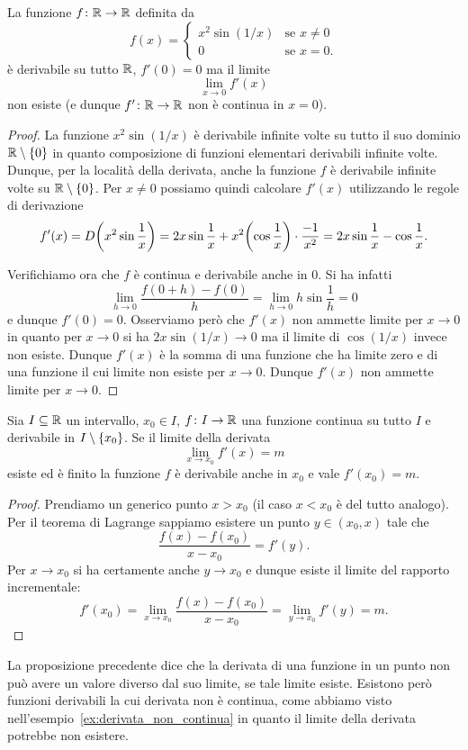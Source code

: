 \begin{example}
\label{ex:derivata_non_continua}%
\mymark{**}%
%
%
La funzione $f\colon {\mathbb R} \to {\mathbb R}$ definita da
\[
  f(x)
  = \begin{cases}
    x^2 \sin(1/x) & \text{se $x \neq 0$} \\
    0 & \text{se $x=0$.}
  \end{cases}
\]
è derivabile su tutto ${\mathbb R}$, $f'(0)=0$ ma il limite
\[
\lim_{x\to 0} f'(x)
\]
non esiste (e dunque $f'\colon {\mathbb R}\to{\mathbb R}$ non è continua in $x=0$).
\end{example}
%
\begin{proof}
La funzione $x^2 \sin(1/x)$ è derivabile infinite volte su tutto il suo dominio ${\mathbb R}\setminus{\left\{ 0 \right\}}$ in quanto composizione di funzioni elementari derivabili infinite volte.
Dunque, per la località della derivata, anche la funzione $f$ è derivabile infinite volte su ${\mathbb R}\setminus{\left\{ 0 \right\}}$.
Per $x\neq 0$ possiamo quindi calcolare $f'(x)$ utilizzando le regole di derivazione
\[
  f'(x)
  = D {\left( x^2\sin \frac 1 x \right)}
  = 2x \sin \frac 1 x + x^2 {\left( \cos \frac 1 x \right)} \cdot\frac{-1}{x^2}
  = 2x \sin \frac 1 x - \cos \frac 1 x.
\]

Verifichiamo ora che $f$ è continua e derivabile anche in $0$.
Si ha infatti
\[
 \lim_{h\to 0}\frac{f(0+h)-f(0)}{h}
 = \lim_{h\to 0} h \sin \frac 1 h = 0
\]
e dunque $f'(0) = 0$.
Osserviamo però che $f'(x)$ non ammette limite per $x\to 0$
in quanto per $x \to 0$ si ha $2x \sin(1/x) \to 0$ ma il limite di $\cos (1/x)$ invece non esiste. Dunque $f'(x)$ è la somma di una funzione che ha limite zero e di una funzione il cui limite non esiste per $x\to 0$. Dunque $f'(x)$ non ammette limite per $x\to 0$.
\end{proof}

\begin{proposition}%
\label{prop:4384774}\mymark{**}%
Sia $I\subseteq {\mathbb R}$ un intervallo, $x_0\in I$,
$f\colon I \to {\mathbb R}$ una funzione continua su tutto $I$ 
e derivabile in $I\setminus{\left\{ x_0 \right\}}$.
Se il limite della derivata
\[
  \lim_{x\to x_0} f'(x) = m
\]
esiste ed è finito la funzione $f$ è derivabile anche in $x_0$ e vale $f'(x_0) = m$.
\end{proposition}
%
\begin{proof}
\mymark{*}
Prendiamo un generico punto $x>x_0$ (il caso $x<x_0$ è del tutto analogo).
Per il teorema
di Lagrange sappiamo esistere un punto $y\in (x_0,x)$ tale che
\[
  \frac{f(x)-f(x_0)}{x-x_0} = f'(y).
\]
Per $x\to x_0$ si ha certamente anche $y\to x_0$ e dunque
esiste il limite del rapporto incrementale:
\[
  f'(x_0) = \lim_{x\to x_0} \frac{f(x)-f(x_0)}{x-x_0}
  = \lim_{y\to x_0} f'(y) = m.
\]
\end{proof}
%
La proposizione precedente dice che la derivata di una funzione in un
punto non può avere un valore diverso dal suo limite, se tale limite esiste.
Esistono però funzioni derivabili la cui derivata non è
continua, come abbiamo visto
nell'esempio~\ref{ex:derivata_non_continua}
in quanto il limite della derivata potrebbe non esistere.


